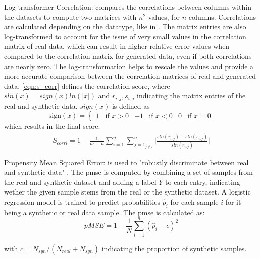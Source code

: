 \begin{description}
  \item Log-transformer Correlation:
  compares the correlations between columns within the datasets to compute two matrices with $n^2$ values, for $n$ columns.
  Correlations are calculated depending on the datatype, like in \cite{brenninkmeijer2019GenerationEvaluationTabular}.
  The matrix entries are also log-transformed to account for the issue of very small values in the correlation matrix of real data, which can result in higher relative error values when compared to the correlation matrix for generated data, even if both correlations are nearly zero. 
  The log-transformation helps to rescale the values and provide a more accurate comparison between the correlation matrices of real and generated data.
  \autoref{eqn:s_corr} defines the correlation score, where $sln(x) = sign(x)ln(|x|)$ and $r_{i,j}, s_{i,j}$ indicating the matrix entries of the real and synthetic data.
  $sign(x)$ is defined as
  $$\textrm{sign}(x) = \begin{cases}1 & \text{if } x > 0 & -1 & \text{if } x < 0 & 0 & \text{if } x = 0\end{cases}$$
  which results in the final score:
  \begin{equation}
    \begin{align*}
      \label{eqn:s_corrl}
      S_{corrl} = 1-\frac{1}{n^2-n} \sum_{i=1}^{n}\sum_{j=1_{j \neq i}}^{n} \bigg| \frac{sln(r_{i,j})- sln(s_{i,j})}{sln(r_{i,j})}\bigg| 
      \end{align*}
  \end{equation}


  \item Propensity Mean Squared Error:
  is used to "robustly discriminate between real and synthetic data" \cite[p. 3]{chundawat2022UniversalMetricRobust}.
  The \gls{pmse} is computed by combining a set of samples from the real and synthetic dataset and adding a label $Y$ to each entry, 
  indicating wether the given sample stems from the real or the synthetic dataset.
  A logistic regression model is trained to predict probabilities $\hat{p}_i$ for each sample $i$ for it being a synthetic or real data sample.
  The \gls{pmse} is calculated as:
  $$pMSE = 1-\frac{1}{N} \sum_{i=1}^{n}(\hat{p}_i-c)^2$$

  with $c=N_{syn}/(N_{real}+N_{syn})$ indicating the proportion of synthetic samples.
  

\end{description}
